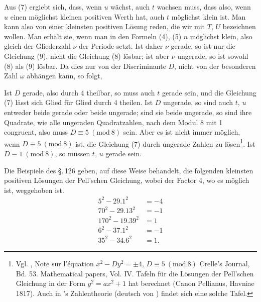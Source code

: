Aus (7) ergiebt sich, dass, wenn $u$ wächst, auch $t$ wachsen
muss, dass also, wenn $u$ einen möglichst kleinen positiven Werth
hat, auch $t$ möglichst klein ist. Man kann also von einer kleinsten
positiven Lösung reden, die wir mit $T$, $U$ bezeichnen wollen. Man
erhält sie, wenn man in den Formeln (4), (5) $n$ möglichst klein,
also gleich der Gliederzahl $\nu$ der Periode setzt. Ist daher $\nu$
gerade, so ist nur die Gleichung (9), nicht die Gleichung (8)
lösbar; ist aber $\nu$ ungerade, so ist sowohl (8) als (9) lösbar. Da
dies nur von der Discriminante $D$, nicht von der besonderen
Zahl $\omega$ abhängen kann, so folgt,


Ist $D$ gerade, also durch 4 theilbar, so muss auch $t$ gerade
sein, und die Gleichung (7) lässt sich Glied für Glied durch 4
theilen. Ist $D$ ungerade, so sind auch $t$, $u$ entweder beide gerade
oder beide ungerade; sind sie beide ungerade, so sind ihre Quadrate,
wie alle ungeraden Quadratzahlen, nach dem Modul 8 mit
1 congruent, also muss $D \equiv 5\ (\mathrm{mod}\ 8)$ sein. Aber es ist nicht
immer möglich, wenn $D \equiv 5\ (\mathrm{mod}\ 8)$ ist, die Gleichung (7)
durch ungerade Zahlen zu lösen\footnote{Vgl. , Note sur l'équation $x^2 - D y^2 = \pm 4$, $D \equiv 5\ (\mathrm{mod}\ 8)$
Crelle's Journal, Bd. 53. Mathematical papers, Vol. IV. Tafeln für die
Lösungen der Pell'schen Gleichung in der Form $y^2 = a x^2 + 1$ hat
 berechnet (Canon Pellianus, Havniae 1817). Auch in 's
Zahlentheorie (deutsch von ) findet sich eine solche Tafel.}. Ist $D \equiv 1\ (\mathrm{mod}\ 8)$, so
müssen $t$, $u$ gerade sein.

Die Beispiele des \S.\,126 geben, auf diese Weise behandelt,
die folgenden kleinsten positiven Lösungen der Pell'schen
Gleichung, wobei der Factor 4, wo es möglich ist, weggehoben ist.
\[
\begin{aligned}
5^2 - 29.1^2 &= -4\\
70^2 - 29.13^2 &= -1\\
170^2 - 19.39^2 &= 1\\
6^2 - 37.1^2 &= -1\\
35^2 - 34.6^2 &= 1.
\end{aligned}
\]
